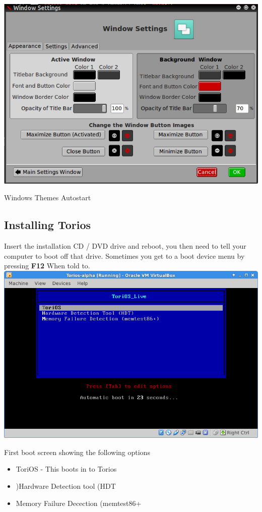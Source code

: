 \documentclass[12pt,a4paper]{book}
\begin{document}
\begin{center}
\includegraphics[width=0.7\linewidth]{window-settings}
\end{center}










{Windows}
{Themes}
{Autostart}






\subsection{Installing Torios}

Insert the installation CD / DVD drive and reboot, you then need to tell your computer to boot off that drive.  Sometimes you get to a boot device menu by pressing \textbf{F12} When told to.  \\

\includegraphics[width=0.7\linewidth]{boot-screen1}

First boot screen showing the following options \\

\begin{itemize}
\item{ToriOS - This boots in to Torios} 
\item){Hardware Detection tool (HDT}
\item{Memory Failure Decection (memtest86+}
\end{itemize}
\end{document}
